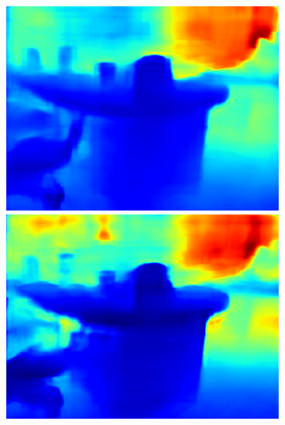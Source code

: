 \begin{figure}[htb]
\begin{subfigure}{0.15\linewidth}
\begin{minipage}[t]{1\linewidth}
  \includegraphics[width=1\linewidth]{figure/nyu_result/kitchen_rgb_00850.png}
  \includegraphics[width=1\linewidth]{figure/nyu_without/kitchen_rgb_00850.png}
  \end{minipage}%
  \end{subfigure}
  \begin{subfigure}{0.15\linewidth}
    

\end{subfigure}
\end{figure}
